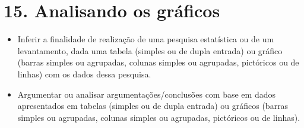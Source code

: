 \chapter{15. Analisando os gráficos}


\begin{itemize}
\item Inferir a finalidade de realização de uma pesquisa estatística ou de
um levantamento, dada uma tabela (simples ou de dupla entrada) ou
gráfico (barras simples ou agrupadas, colunas simples ou agrupadas,
pictóricos ou de linhas) com os dados dessa pesquisa.

\item Argumentar ou analisar argumentações/conclusões com base em dados
apresentados em tabelas (simples ou de dupla entrada) ou gráficos
(barras simples ou agrupadas, colunas simples ou agrupadas, pictóricos
ou de linhas).
\end{itemize}



